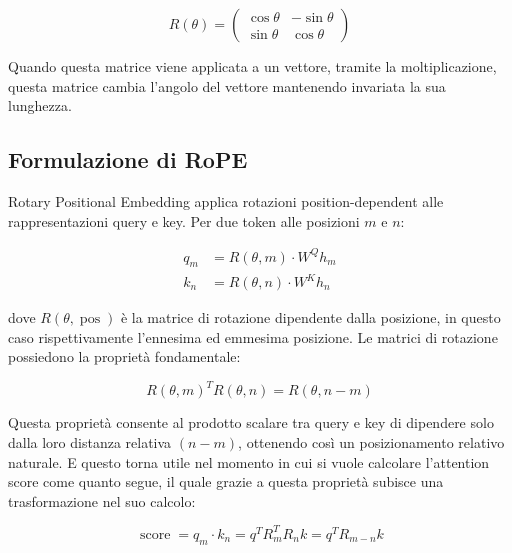 \begin{equation}
    R(\theta) = \begin{pmatrix}
    \cos\theta & -\sin\theta \\
    \sin\theta & \cos\theta
    \end{pmatrix}
\end{equation}

Quando questa matrice viene applicata a un vettore, tramite la moltiplicazione, questa matrice cambia l'angolo del vettore mantenendo invariata la sua lunghezza.

\subsection{Formulazione di RoPE}
Rotary Positional Embedding applica rotazioni position-dependent alle rappresentazioni query e key. Per due token alle posizioni $m$ e $n$:

\begin{align*}
    q_m &= R(\theta, m) \cdot W^Q h_m \\
    k_n &= R(\theta, n) \cdot W^K h_n
\end{align*}

dove $R(\theta, \operatorname{pos})$ è la matrice di rotazione dipendente dalla posizione, in questo caso rispettivamente l'ennesima ed emmesima posizione. Le matrici di rotazione possiedono la proprietà fondamentale:

\begin{equation}
    R(\theta, m)^T R(\theta, n) = R(\theta, n-m)
\end{equation}

Questa proprietà consente al prodotto scalare tra query e key di dipendere solo dalla loro distanza relativa $(n-m)$, ottenendo così un posizionamento relativo naturale. E questo torna utile nel momento in cui si vuole calcolare l'attention score come quanto segue, il quale grazie a questa proprietà subisce una trasformazione nel suo calcolo:

\begin{equation}
    \operatorname{score}= q_m\cdot k_n = q^TR_m^TR_nk = q^TR_{m-n}k
\end{equation}

